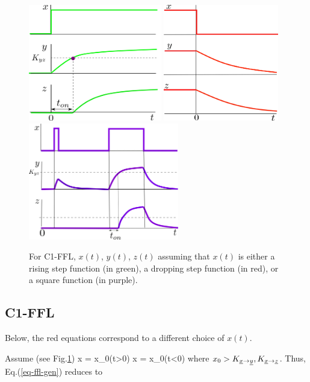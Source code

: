 \begin{figure}[h!]
\centering
\includegraphics[height=2in]
{autoregulons/c1-ffl-up-green.png}
\includegraphics[height=2in]
{autoregulons/c1-ffl-down-green.png}
\includegraphics[height=2in]
{autoregulons/c1-ffl-up-down-green.png}
\caption{For C1-FFL, $x(t)$, $y(t)$, $z(t)$ assuming 
that $x(t)$ is either a rising step function (in green),
a dropping step function (in red),
or a square function (in purple).}
\label{fig-c1-ffl-triple}
\end{figure}



\subsection{C1-FFL}
Below, the red equations 
correspond to a different choice of $x(t)$.

Assume (see Fig.\ref{fig-c1-ffl-triple})
\beq
x = x_0\indi(t>0)
\eeq
\beq \nonumber
\color{red}
x = x_0\indi(t<0)
\eeq
where $x_0 > K_{\rvx\rarrow\rvy}, K_{\rvx\rarrow\rvz}$.
Thus, Eq.(\ref{eq-ffl-gen}) reduces to

